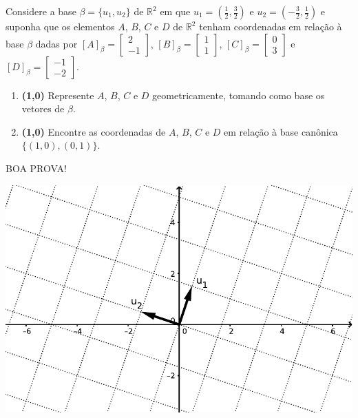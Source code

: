 \documentclass[12pt,a4paper]{article}
\newcommand{\fixme}{{\color{red}(...)}}
\newcommand*\R{\mathbb{R}}
\begin{document}
\begin{ExerciseList}
\Exercise%
Considere a base $\beta = \{ u_1, u_2 \}$ de $\R^2$ em que $u_1 = (\frac{1}{2}, \frac{3}{2})$ e $u_2 = (-\frac{3}{2}, \frac{1}{2})$ e suponha que os elementos $A$, $B$, $C$ e $D$ de $\R^2$ tenham coordenadas em relação à base $\beta$ dadas por
$[A]_\beta = \begin{bmatrix}  2 \\ -1 \end{bmatrix}$,
$[B]_\beta = \begin{bmatrix}  1 \\  1 \end{bmatrix}$,
$[C]_\beta = \begin{bmatrix}  0 \\  3 \end{bmatrix}$ e
$[D]_\beta = \begin{bmatrix} -1 \\ -2 \end{bmatrix}$.
\begin{enumerate}
\item \textbf{(1,0)} Represente $A$, $B$, $C$ e $D$ geometricamente, tomando como base os vetores de $\beta$.
\item \textbf{(1,0)} Encontre as coordenadas de $A$, $B$, $C$ e $D$ em relação à base canônica $\{ (1,0), (0,1) \}$.
\end{enumerate}
\Answer \fixme

\end{ExerciseList}

\begin{center}
BOA PROVA!
\end{center}

\newpage

\begin{center}
\includegraphics[width=15.0cm]{img/prova-2-nex-base-R2}
\end{center}

\end{document}

